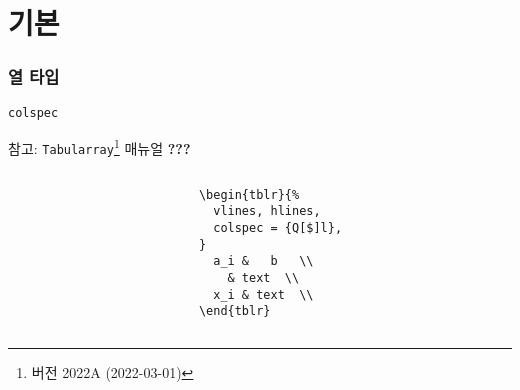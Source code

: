 \documentclass{beamer}
\newcommand*{\manual}[1]{\texttt{Tabularray}\footnote[2]{버전 2022A (2022-03-01)} 매뉴얼 \textbf{#1}}
\begin{document}
\section{기본}
\begin{frame}
  \frametitle{열 타입}
  \texttt{colspec}

  참고: \manual{???}

  \begin{columns}
    \begin{column}{0.5\textwidth}
      \begin{center}
      \end{center}
    \end{column}

    \begin{column}{0.5\textwidth}
      \begin{lstlisting}
\begin{tblr}{%
  vlines, hlines,
  colspec = {Q[$]l},
}
  a_i &   b   \\
    & text  \\
  x_i & text  \\
\end{tblr}
      \end{lstlisting}
    \end{column}
  \end{columns}
\end{frame}
\end{document}
